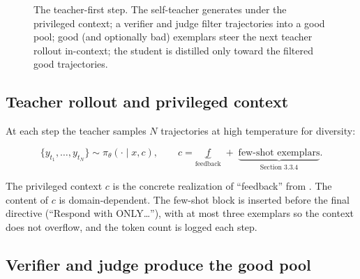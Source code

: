 \documentclass[12pt,a4paper]{report}
\begin{document}
\begin{figure}[H]
\centering
{}
\caption{The teacher-first step. The self-teacher generates under the privileged context; a verifier and judge filter trajectories into a good pool; good (and optionally bad) exemplars steer the next teacher rollout in-context; the student is distilled only toward the filtered good trajectories.}
\label{fig:tf-step}
\end{figure}

\subsection{Teacher rollout and privileged context}\label{teacher-rollout-and-privileged-context}

At each step the teacher samples \(N\) trajectories at high temperature for diversity:

\[
\{y_{t_1}, \dots, y_{t_N}\} \sim \pi_\theta(\cdot \mid x, c), \qquad c = \underbrace{f}_{\text{feedback}} \;+\; \underbrace{\text{few-shot exemplars}}_{\text{Section~3.3.4}}.
\]

The privileged context \(c\) is the concrete realization of ``feedback'' from \cite{r1}. The content of \(c\) is domain-dependent. The few-shot block is inserted before the final directive (``Respond with ONLY\ldots{}''), with at most three exemplars so the context does not overflow, and the token count is logged each step.

\subsection{Verifier and judge produce the good pool}\label{verifier-and-judge-produce-the-good-pool}
\end{document}
